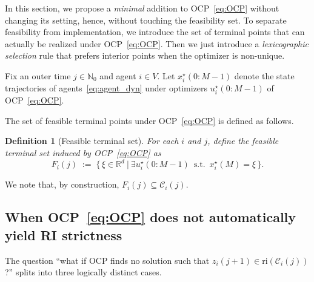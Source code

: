 \documentclass[12pt,draftcls,onecolumn]{IEEEtran}
\newtheorem{definition}{Definition}
\def\Cij{\mathcal{C}_i (j)}
\def\ri{\mathrm{ri}}
\begin{document}
In this section, we propose a \emph{minimal} addition to OCP~\eqref{eq:OCP} without changing its setting, hence, without touching the feasibility set.
To separate feasibility from implementation, we introduce the set of terminal points that can actually be realized under OCP~\eqref{eq:OCP}.
Then we just introduce a \emph{lexicographic selection} rule that prefers interior points when the optimizer is non-unique.

Fix an outer time $j\in\mathbb N_0$ and agent $i\in V$.
Let $x_i^\star(0{:}M-1)$ denote the state trajectories of agents~\eqref{eq:agent_dyn} under optimizers $u_i^\star(0{:}M-1)$ of OCP~\eqref{eq:OCP}.

The set of feasible terminal points under OCP~\eqref{eq:OCP} is defined as follows.

\begin{definition}[Feasible terminal set]\label{def:Fi}
For each $i$ and $j$, define the \emph{feasible terminal set} induced by OCP~\eqref{eq:OCP} as
\[
F_i(j) \;:=\;\Big\{\, \xi\in\mathbb R^d \ \Big|\ \exists u_i^\star(0{:}M-1) \,\,\,\mathrm{ s.t. }\,\,\, x_i^\star(M)=\xi \,\Big\}.
\]
\end{definition}
We note that, by construction, $F_i(j)\subseteq \Cij$.



\subsection{When OCP~\eqref{eq:OCP} does not automatically yield RI strictness}
\label{subsec:ri_selection}
The question ``what if OCP finds no solution such that $z_i(j{+}1)\in\ri(\Cij)$?'' splits into
three logically distinct cases.
\end{document}
